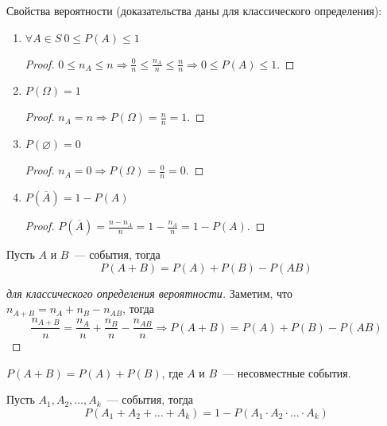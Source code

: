 Свойства вероятности (доказательства даны для классического определения):
\begin{enumerate}
	\item $\forall A \in S \ 0 \leqslant P(A) \leqslant 1$
	\begin{proof}
	$0 \leqslant n_A \leqslant n \Rightarrow
	\frac0n \leqslant \frac{n_A}n \leqslant \frac{n}n \Rightarrow
	0 \leqslant P(A) \leqslant 1$.
	\end{proof}
	
	\item $P(\Omega) = 1$
	\begin{proof}
	$n_A = n \Rightarrow P(\Omega) = \frac{n}n = 1$.
	\end{proof}
	
	\item $P(\varnothing) = 0$
	\begin{proof}
	$n_A = 0 \Rightarrow P(\Omega) = \frac0n = 0$.
	\end{proof}
	
	\item $P(\overline A) = 1 - P(A)$
	\begin{proof}
	$P(\overline A) = \frac{n - n_A}n = 1 - \frac{n_A}n = 1 - P(A)$.
	\end{proof}
\end{enumerate}

\begin{theorem}
Пусть $A$ и $B$~--- события, тогда
\begin{equation*}
P(A + B) = P(A) + P(B) - P(AB)
\end{equation*}
\end{theorem}
\begin{proof}[для классического определения вероятности]
Заметим, что $n_{A + B} = n_A + n_B - n_{AB}$, тогда
\begin{equation*}
\frac{n_{A + B}}n = \frac{n_A}n + \frac{n_B}n - \frac{n_{AB}}n \Rightarrow
P(A + B) = P(A) + P(B) - P(AB)
\end{equation*}
\end{proof}

\begin{consequent}
$P(A + B) = P(A) + P(B)$, где $A$ и $B$~--- несовместные события.
\end{consequent}

\begin{theorem}
Пусть $A_1, A_2, \ldots, A_k$~--- события, тогда
\begin{equation*}
P(A_1 + A_2 + \ldots + A_k) = 1 - P(A_1 \cdot A_2 \cdot \ldots \cdot A_k)
\end{equation*}
\end{theorem}

